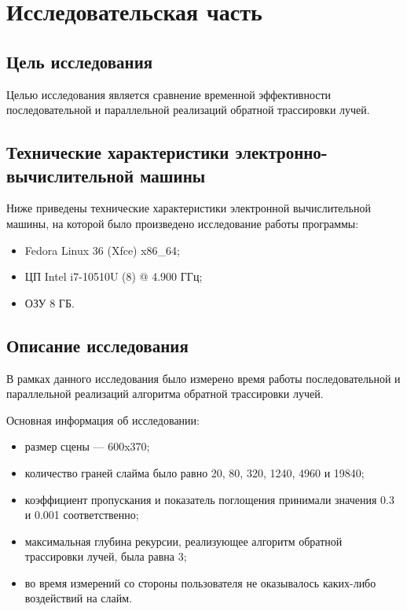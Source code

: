 \chapter{Исследовательская часть}

\section{Цель исследования}

Целью исследования является сравнение временной эффективности последовательной и параллельной реализаций обратной трассировки лучей.

\section{Технические характеристики электронно-вычислительной машины}

Ниже приведены технические характеристики электронной вычислительной машины, на которой было произведено исследование работы программы:

\begin{itemize}
	\item Fedora Linux 36 (Xfce) x86\_64;
	\item ЦП Intel i7-10510U (8) @ 4.900 ГГц;
	\item ОЗУ 8 ГБ.
\end{itemize}

\section{Описание исследования}

В рамках данного исследования было измерено время работы последовательной и параллельной реализаций алгоритма обратной трассировки лучей.

Основная информация об исследовании:
\begin{itemize}
	\item размер сцены --- 600x370;
	
	\item количество граней слайма было равно 20, 80, 320, 1240, 4960 и 19840;
	
	\item коэффициент пропускания и показатель поглощения принимали значения 0.3 и 0.001 соответственно;
	
	\item максимальная глубина рекурсии, реализующее алгоритм обратной трассировки лучей, была равна 3;
	
	\item во время измерений со стороны пользователя не оказывалось каких-либо воздействий на слайм.
\end{itemize}


